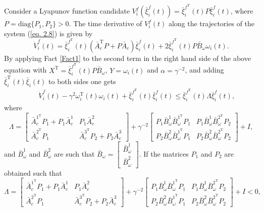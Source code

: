 \documentclass[12pt,draftcls,onecolumn]{IEEEtran}
\begin{document}
 Consider a Lyapunov function candidate  $V_i^f(\bar{\xi}_i^f(t))=\bar \xi_i^{f^{\text{T}}}(t)P\bar \xi_i^f(t)$, where $P=\text{diag}\{P_1,P_2\}>0$. The time derivative of $V_i^f(t)$ along the trajectories of the system (\ref{eq. 2.8}) is given by
$$
	\dot V_i^f(t)=\bar \xi_i^{f^{\text{T}}}(t)(\bar A_{c}^{\text{T}}P+P\bar A_{c}){\bar \xi_i^f}(t)+2\bar \xi_i^{f^{\text{T}}}(t)P\bar B_{\omega}\omega_i(t).
$$
By applying Fact \ref{Fact1} to the second term in the right hand side of the above equation with $X^{\text{T}}=\bar \xi_i^{f^{\text{T}}}(t)P\bar B_{\omega}$, $Y=\omega_i(t)$ and $\alpha=\gamma^{-2}$, and adding $\bar \xi_i^{\text{T}}(t)\bar \xi_i(t)$ to both sides one gets 
\begin{eqnarray}
&&\dot V_i^f(t)-\gamma^{2}\omega_i^{\text{T}}(t)\omega_i(t)+\bar \xi_i^{f^\text{T}}(t)\bar \xi_i^f(t) \leq \bar \xi_i^{f^{\text{T}}}(t)\Lambda  {\bar \xi_i^f}(t),\label{eq 2.22}
\end{eqnarray}
where
 $$\Lambda=\begin{bmatrix} \bar A_{c}^{1^\text{T}}P_1+P_1\bar A_{c}^1 & P_1\bar A_{c}^2 \\ \bar A_{c}^{2^\text{T}} P_1 & \bar A_{c}^{3^\text{T}}P_2+P_2\bar A_{c}^{3} \end{bmatrix}+ \gamma^{-2} \begin{bmatrix} P_1 \bar B_{\omega}^1 \bar B_{\omega}^{1^{\text{T}}} P_1 &  P_1 \bar B_{\omega}^1 \bar B_{\omega}^{2^{\text{T}}} P_2 \\  P_2 \bar B_{\omega}^2 \bar B_{\omega}^{1^{\text{T}}} P_1 &  P_2 \bar B_{\omega}^2 \bar B_{\omega}^{2^{\text{T}}} P_2 \end{bmatrix}+I,
$$
and $\bar B_{\omega}^1$ and $\bar B_{\omega}^2$ are such that $\bar B_{\omega}=\begin{bmatrix}\bar B_{\omega}^1\\\bar B_{\omega}^2\end{bmatrix}$.
If the matrices $P_1$ and $P_2$ are obtained such that 
\begin{equation}
\Lambda=\begin{bmatrix} \bar A_{c}^{1^\text{T}}P_1+P_1\bar A_{c}^1 & P_1\bar A_{c}^2 \\ \bar A_{c}^{2^\text{T}} P_1 & \bar A_{c}^{3^\text{T}}P_2+P_2\bar A_{c}^{3} \end{bmatrix}+ \gamma^{-2} \begin{bmatrix} P_1 \bar B_{\omega}^1 \bar B_{\omega}^{1^{\text{T}}} P_1 &  P_1 \bar B_{\omega}^1 \bar B_{\omega}^{2^{\text{T}}} P_2 \\  P_2 \bar B_{\omega}^2 \bar B_{\omega}^{1^{\text{T}}} P_1 &  P_2 \bar B_{\omega}^2 \bar B_{\omega}^{2^{\text{T}}} P_2 \end{bmatrix}+I<0,\label{Nolinear MI}
\end{equation}
\end{document}
